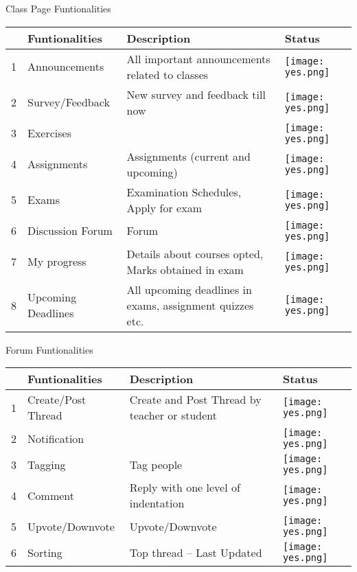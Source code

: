 Class Page Funtionalities
\begin{center}
 \begin{tabular}{|p{0.4cm}|p{4cm}|p{9cm}|p{1.3cm}|} 
 \hline
  & \textbf{Funtionalities} & \textbf{Description} & \textbf{Status} \\ [0.5ex] 
 \hline
 1 & Announcements & All important announcements related to classes & \texttt{[image: yes.png]} \\ 
 \hline
 2 & Survey/Feedback & New survey and feedback till now & \texttt{[image: yes.png]} \\
 \hline
 3 & Exercises & & \texttt{[image: yes.png]} \\
 \hline
 4 & Assignments & Assignments (current and upcoming) & \texttt{[image: yes.png]} \\
 \hline
 5 & Exams & Examination Schedules, Apply for exam & \texttt{[image: yes.png]} \\
 \hline
 6 & Discussion Forum & Forum & \texttt{[image: yes.png]} \\
 \hline
 7 & My progress & Details about courses opted, Marks obtained in exam & \texttt{[image: yes.png]} \\
 \hline
 8 & Upcoming Deadlines & All upcoming deadlines in exams, assignment quizzes etc. & \texttt{[image: yes.png]} \\
 \hline
 \end{tabular}
\end{center}

Forum Funtionalities
\begin{center}
 \begin{tabular}{|p{0.4cm}|p{4cm}|p{9cm}|p{1.3cm}|} 
 \hline
  & \textbf{Funtionalities} & \textbf{Description} & \textbf{Status} \\ [0.5ex] 
 \hline
 1 & Create/Post Thread & Create and Post Thread by teacher or student & \texttt{[image: yes.png]} \\ 
 \hline
 2 & Notification & & \texttt{[image: yes.png]} \\
 \hline
 3 & Tagging & Tag people & \texttt{[image: yes.png]} \\
 \hline
 4 & Comment & Reply with one level of indentation & \texttt{[image: yes.png]} \\
 \hline
 5 & Upvote/Downvote & Upvote/Downvote & \texttt{[image: yes.png]} \\
 \hline
 6 & Sorting & Top thread – Last Updated & \texttt{[image: yes.png]} \\
 \hline
 \end{tabular}
\end{center}


